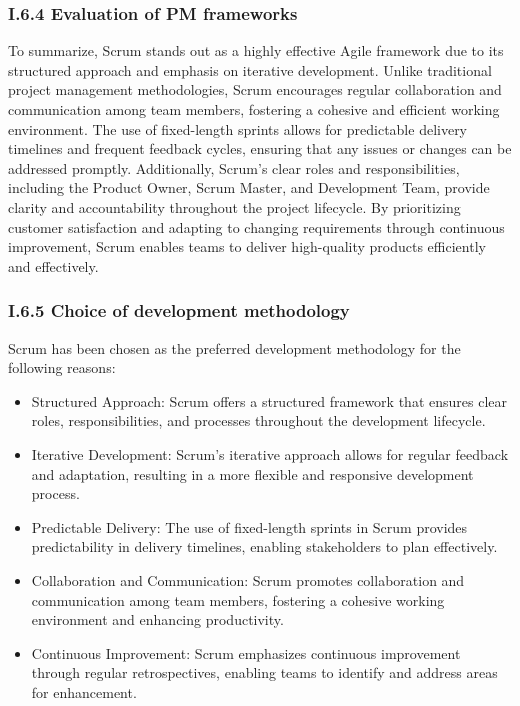 \subsubsection*{I.6.4 Evaluation of PM frameworks}
To summarize, Scrum stands out as a highly effective Agile framework due to its structured approach and emphasis on iterative development. Unlike traditional project management methodologies, Scrum encourages regular collaboration and communication among team members, fostering a cohesive and efficient working environment. The use of fixed-length sprints allows for predictable delivery timelines and frequent feedback cycles, ensuring that any issues or changes can be addressed promptly. Additionally, Scrum's clear roles and responsibilities, including the Product Owner, Scrum Master, and Development Team, provide clarity and accountability throughout the project lifecycle. By prioritizing customer satisfaction and adapting to changing requirements through continuous improvement, Scrum enables teams to deliver high-quality products efficiently and effectively.

\subsubsection*{I.6.5 Choice of development methodology}


Scrum has been chosen as the preferred development methodology for the following reasons:

\begin{itemize}
    \item Structured Approach: Scrum offers a structured framework that ensures clear roles, responsibilities, and processes throughout the development lifecycle.
    \item Iterative Development: Scrum's iterative approach allows for regular feedback and adaptation, resulting in a more flexible and responsive development process.
    \item Predictable Delivery: The use of fixed-length sprints in Scrum provides predictability in delivery timelines, enabling stakeholders to plan effectively.
    \item Collaboration and Communication: Scrum promotes collaboration and communication among team members, fostering a cohesive working environment and enhancing productivity.
    \item Continuous Improvement: Scrum emphasizes continuous improvement through regular retrospectives, enabling teams to identify and address areas for enhancement.
\end{itemize}

